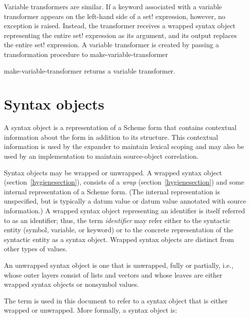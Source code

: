 Variable transformers are similar.
If a keyword associated with a variable transformer appears on
the left-hand side of a {\cf set!} expression, however, no 
exception is raised.
Instead, the transformer receives a wrapped syntax object representing the
entire {\cf set!} expression as its argument, and its output
replaces the entire {\cf set!} expression.
A variable transformer is created by passing a transformation
procedure to {\cf make-variable-transformer}

\begin{entry}{%
}


{\cf make-variable-transformer} returns a variable transformer.
\end{entry}

\section{Syntax objects}
\label{syntaxobjectssection}

A syntax object is a representation of a Scheme form that contains
contextual information about the form in addition to its structure.
This contextual information is used by the expander to maintain
lexical scoping and may also be used by an implementation to maintain
source-object correlation.

Syntax objects may be wrapped or unwrapped.
A wrapped syntax object (section~\ref{hygienesection}), consists of a
\textit{wrap} (section~\ref{hygienesection}) and some internal representation
of a Scheme form.
(The internal representation is unspecified, but is typically a 
datum value or datum value annotated with source information.)
A wrapped syntax object representing an identifier is itself referred to as
an identifier; thus, the term \textit{identifier} may refer either to
the syntactic entity (symbol, variable, or keyword) or to the
concrete representation of the syntactic entity as a syntax object.
Wrapped syntax objects are distinct from other types of values.

An unwrapped syntax object is one that is unwrapped, fully or partially,
i.e., whose outer layers consist of lists and vectors and whose leaves are
either wrapped syntax objects or nonsymbol values.

The term  is used in this document to refer to
a syntax object that is either wrapped or unwrapped.
More formally, a syntax object is:

